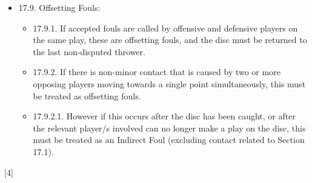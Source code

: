 \begin{itemize}[noitemsep]
    \item 17.9. Offsetting Fouls:
        \begin{itemize}
            \item 17.9.1. If accepted fouls are called by offensive and defensive players on the same play, these are offsetting fouls, and the disc must be returned to the last non-disputed thrower.
            \item 17.9.2. If there is non-minor contact that is caused by two or more opposing players moving towards a single point simultaneously, this must be treated as offsetting fouls.
            \item 17.9.2.1. However if this occurs after the disc has been caught, or after the relevant player/s involved can no longer make a play on the disc, this must be treated as an Indirect Foul (excluding contact related to Section 17.1).
        \end{itemize}
\end{itemize}
\begin{center}[4]\end{center}
